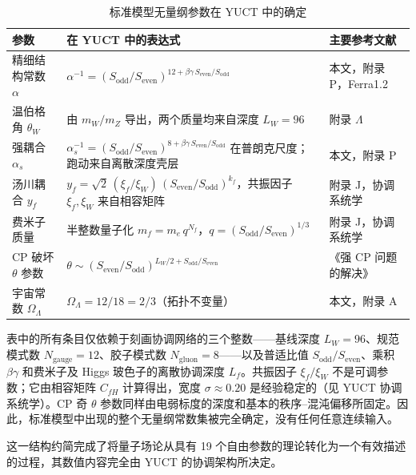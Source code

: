 \documentclass[12pt,a4paper]{article}
\begin{document}
	\begin{table}[htbp]
		\centering
		\caption{标准模型无量纲参数在 YUCT 中的确定}
		\label{tab:SMparams}
		\small
		\begin{tabular}{@{}p{3.0cm} p{5.2cm} p{5.2cm}@{}}
			\toprule
			\textbf{参数} & \textbf{在 YUCT 中的表达式} & \textbf{主要参考文献} \\
			\midrule
			精细结构常数 \(\alpha\) &
			\(\alpha^{-1} = (S_{\mathrm{odd}}/S_{\mathrm{even}})^{12+\beta\gamma\,S_{\mathrm{even}}/S_{\mathrm{odd}}}\) &
			本文，附录 P，Ferra1.2 \\
			温伯格角 \(\theta_W\) &
			由 \(m_W/m_Z\) 导出，两个质量均来自深度 \(L_W=96\) &
			附录 \(\Lambda\) \\
			强耦合 \(\alpha_s\) &
			\(\alpha_s^{-1} = (S_{\mathrm{odd}}/S_{\mathrm{even}})^{8+\beta\gamma\,S_{\mathrm{even}}/S_{\mathrm{odd}}}\) 在普朗克尺度；跑动来自离散深度壳层 &
			本文，附录 P \\
			汤川耦合 \(y_f\) &
			\(y_f = \sqrt{2}\,(\xi_f/\xi_W)\,(S_{\mathrm{even}}/S_{\mathrm{odd}})^{k_f}\)，共振因子 \(\xi_f,\xi_W\) 来自相容矩阵 &
			附录 J，协调系统学 \\
			费米子质量 & 半整数量子化 \(m_f = m_e\,q^{N_f}\)，\(q=(S_{\mathrm{odd}}/S_{\mathrm{even}})^{1/3}\) &
			附录 J，协调系统学 \\
			CP 破坏 \(\theta\) 参数 &
			\(\theta \sim (S_{\mathrm{even}}/S_{\mathrm{odd}})^{L_W/2 + S_{\mathrm{odd}}/S_{\mathrm{even}}}\) &
			《强 CP 问题的解决》 \\
			宇宙常数 \(\Omega_\Lambda\) &
			\(\Omega_\Lambda = 12/18 = 2/3\)（拓扑不变量） &
			本文，附录 A \\
			\bottomrule
		\end{tabular}
	\end{table}
	
	表中的所有条目仅依赖于刻画协调网络的三个整数——基线深度 \(L_W=96\)、规范模式数 \(N_{\mathrm{gauge}}=12\)、胶子模式数 \(N_{\mathrm{gluon}}=8\)——以及普适比值 \(S_{\mathrm{odd}}/S_{\mathrm{even}}\)、乘积 \(\beta\gamma\) 和费米子及 Higgs 玻色子的离散协调深度 \(L_f\)。共振因子 \(\xi_f/\xi_W\) 不是可调参数；它由相容矩阵 \(C_{fH}\) 计算得出，宽度 \(\sigma \approx 0.20\) 是经验稳定的（见 YUCT 协调系统学）。CP 奇 \(\theta\) 参数同样由电弱标度的深度和基本的秩序–混沌偏移所固定。因此，标准模型中出现的整个无量纲常数集被完全确定，没有任何任意连续输入。
	
	这一结构约简完成了将量子场论从具有 19 个自由参数的理论转化为一个有效描述的过程，其数值内容完全由 YUCT 的协调架构所决定。
	
\end{document}
